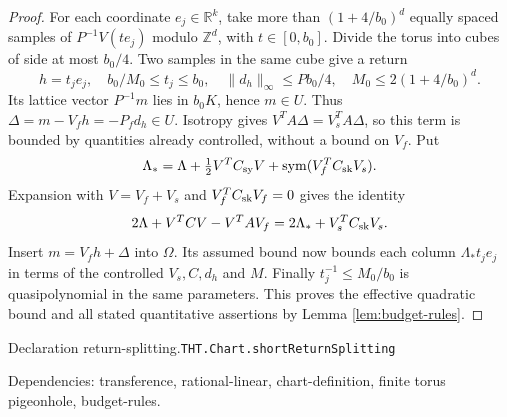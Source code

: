 \documentclass[11pt]{article}
\theoremstyle{definition}
\newcommand{\R}{\mathbb R}
\newcommand{\Z}{\mathbb Z}
\newcommand{\sym}{\operatorname{sym}}
\numberwithin{equation}{section}
\newcommand{\bp}[3]{\par\smallskip\begingroup\footnotesize
\noindent\hypertarget{bp:#1}{\textsf{Declaration #1.}}\quad\nolinkurl{#2}\par
\noindent\textsf{Dependencies:} #3.\par\endgroup\smallskip}
\begin{document}
\begin{proof}
For each coordinate $e_j\in\R^k$, take more than $(1+4/b_0)^d$ equally spaced samples of $P^{-1}V(te_j)$ modulo $\Z^d$, with $t\in[0,b_0]$. Divide the torus into cubes of side at most $b_0/4$. Two samples in the same cube give a return
\[
 h=t_je_j,\quad b_0/M_0\le t_j\le b_0,\quad
 \|d_h\|_\infty\le Pb_0/4,\quad M_0\le2(1+4/b_0)^d.
\]
Its lattice vector $P^{-1}m$ lies in $b_0K$, hence $m\in U$. Thus $\Delta=m-V_fh=-P_fd_h\in U$. Isotropy gives $V^TA\Delta=V_s^TA\Delta$, so this term is bounded by quantities already controlled, without a bound on $V_f$. Put
\[
 \Lambda_* =\Lambda+\tfrac12V^TC_{\rm sy}V+\sym(V_f^TC_{\rm sk}V_s).
\]
Expansion with $V=V_f+V_s$ and $V_f^TC_{\rm sk}V_f=0$ gives the identity
\[
 2\Lambda+V^TCV-V^TAV_f=2\Lambda_*+V_s^TC_{\rm sk}V_s.
\]
Insert $m=V_fh+\Delta$ into $\Omega$. Its assumed bound now bounds each column $\Lambda_*t_je_j$ in terms of the controlled $V_s,C,d_h$ and $M$. Finally $t_j^{-1}\le M_0/b_0$ is quasipolynomial in the same parameters. This proves the effective quadratic bound and all stated quantitative assertions by Lemma \ref{lem:budget-rules}.
\end{proof}
\bp{return-splitting}{THT.Chart.shortReturnSplitting}{transference, rational-linear, chart-definition, finite torus pigeonhole, budget-rules}
\end{document}
